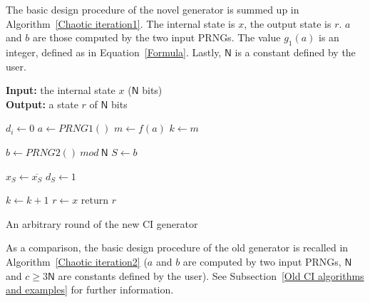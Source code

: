 The basic design procedure of the novel generator is summed up in Algorithm~\ref{Chaotic iteration1}.
The internal state is $x$, the output state is $r$. $a$ and $b$ are those computed by the two input
PRNGs. The value $g_1(a)$ is an integer, defined as in Equation~\ref{Formula}. Lastly, $\mathsf{N}$ is a constant defined by the user.
\begin{algorithm}
\textbf{Input:} the internal state $x$ ($\mathsf{N}$ bits)\\
\textbf{Output:} a state $r$ of $\mathsf{N}$ bits
\begin{algorithmic}[1]
{
\STATE$d_i\leftarrow{0}$\;
}
\ENDFOR
\STATE$a\leftarrow{PRNG1()}$\;
\STATE$m\leftarrow{f(a)}$\;
\STATE$k\leftarrow{m}$\;

\STATE$b\leftarrow{PRNG2()~mod~\mathsf{N}}$\;
\STATE$S\leftarrow{b}$\;
    {
\STATE      $x_S\leftarrow{ \overline{x_S}}$\;
\STATE      $d_S\leftarrow{1}$\;
    
    }
    {
\STATE      $k\leftarrow{ k+1}$\;
    }\ENDIF
\ENDWHILE
$r\leftarrow{x}$\;
return $r$\;
\medskip
\caption{An arbitrary round of the new CI generator}
\label{Chaotic iteration1}
\end{algorithmic}
\end{algorithm}

% 

As a comparison, the basic design procedure of the old generator is recalled in Algorithm~\ref{Chaotic iteration2} ($a$ and $b$ are computed by two input PRNGs, $\mathsf{N}$ and $c\geqslant 3\mathsf{N}$ are constants defined by the user). See Subsection~\ref{Old CI algorithms and examples} for further information.

